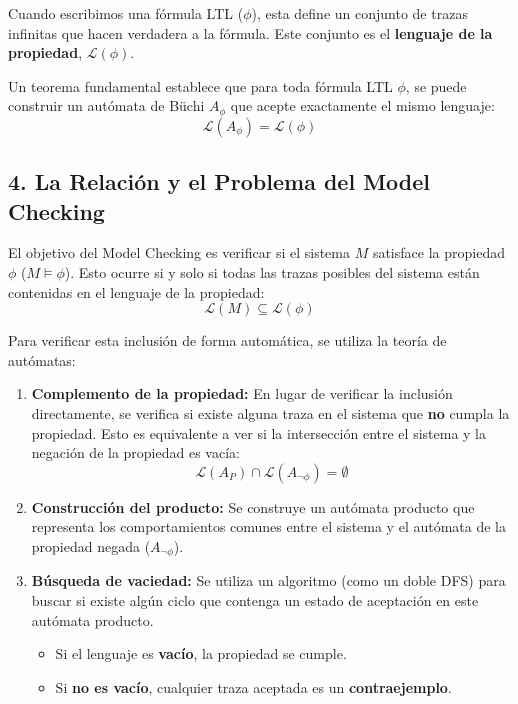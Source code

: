 \documentclass[11pt,a4paper]{article}
\begin{document}
Cuando escribimos una fórmula LTL ($\phi$), esta define un conjunto de trazas infinitas que hacen verdadera a la fórmula. Este conjunto es el \textbf{lenguaje de la propiedad}, $\mathcal{L}(\phi)$.

Un teorema fundamental establece que para toda fórmula LTL $\phi$, se puede construir un autómata de Büchi $A_\phi$ que acepte exactamente el mismo lenguaje:
\[
\mathcal{L}(A_\phi) = \mathcal{L}(\phi)
\]

\subsection{4. La Relación y el Problema del Model Checking}

El objetivo del Model Checking es verificar si el sistema $M$ satisface la propiedad $\phi$ ($M \models \phi$). Esto ocurre si y solo si todas las trazas posibles del sistema están contenidas en el lenguaje de la propiedad:
\[
\mathcal{L}(M) \subseteq \mathcal{L}(\phi)
\]

Para verificar esta inclusión de forma automática, se utiliza la teoría de autómatas:
\begin{enumerate}
    \item \textbf{Complemento de la propiedad:} En lugar de verificar la inclusión directamente, se verifica si existe alguna traza en el sistema que \textbf{no} cumpla la propiedad. Esto es equivalente a ver si la intersección entre el sistema y la negación de la propiedad es vacía:
    \[
    \mathcal{L}(A_P) \cap \mathcal{L}(A_{\neg \phi}) = \emptyset
    \]

    \item \textbf{Construcción del producto:} Se construye un autómata producto que representa los comportamientos comunes entre el sistema y el autómata de la propiedad negada ($A_{\neg \phi}$).

    \item \textbf{Búsqueda de vaciedad:} Se utiliza un algoritmo (como un doble DFS) para buscar si existe algún ciclo que contenga un estado de aceptación en este autómata producto.
    \begin{itemize}
        \item Si el lenguaje es \textbf{vacío}, la propiedad se cumple.
        \item Si \textbf{no es vacío}, cualquier traza aceptada es un \textbf{contraejemplo}.
    \end{itemize}
\end{enumerate}
\end{document}
